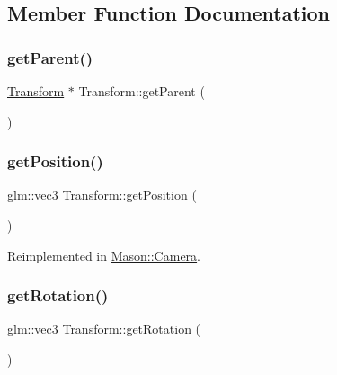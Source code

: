 \subsection{Member Function Documentation}
\hypertarget{class_mason_1_1_transform_ae3e8acbd25d7d171aff00da038f79a9a}{}\label{class_mason_1_1_transform_ae3e8acbd25d7d171aff00da038f79a9a} 
\subsubsection{\texorpdfstring{get\+Parent()}{getParent()}}
{\footnotesize\ttfamily \hyperlink{class_mason_1_1_transform}{Transform} $\ast$ Transform\+::get\+Parent (\begin{DoxyParamCaption}{ }\end{DoxyParamCaption})\hspace{0.3cm}{\ttfamily [virtual]}}

\hypertarget{class_mason_1_1_transform_a0b21f641e72d7b55f3a630b986d0b106}{}\label{class_mason_1_1_transform_a0b21f641e72d7b55f3a630b986d0b106} 
\subsubsection{\texorpdfstring{get\+Position()}{getPosition()}}
{\footnotesize\ttfamily glm\+::vec3 Transform\+::get\+Position (\begin{DoxyParamCaption}{ }\end{DoxyParamCaption})\hspace{0.3cm}{\ttfamily [virtual]}}



Reimplemented in \hyperlink{class_mason_1_1_camera_a71560b8b6216a542ae1958bd91a4361d}{Mason\+::\+Camera}.

\hypertarget{class_mason_1_1_transform_a7367502d4344eff2d88a250084ae19dc}{}\label{class_mason_1_1_transform_a7367502d4344eff2d88a250084ae19dc} 
\subsubsection{\texorpdfstring{get\+Rotation()}{getRotation()}}
{\footnotesize\ttfamily glm\+::vec3 Transform\+::get\+Rotation (\begin{DoxyParamCaption}{ }\end{DoxyParamCaption})\hspace{0.3cm}{\ttfamily [virtual]}}

